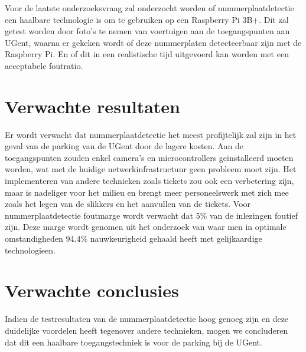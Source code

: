 Voor de laatste onderzoeksvraag zal onderzocht worden of nummerplaatdetectie een haalbare technologie is om te gebruiken op een Raspberry Pi 3B+. Dit zal getest worden door foto’s te nemen van voertuigen aan de toegangspunten aan UGent, waarna er gekeken wordt of deze nummerplaten detecteerbaar zijn met de Raspberry Pi. En of dit in een realistische tijd uitgevoerd kan worden met een acceptabele foutratio.

\section{Verwachte resultaten}
\label{sec:verwachte_resultaten}
Er wordt verwacht dat nummerplaatdetectie het meest profijtelijk zal zijn in het geval van de parking van de UGent door de lagere kosten. Aan de toegangspunten zouden enkel camera’s en microcontrollers geïnstalleerd moeten worden, wat met de huidige netwerkinfrastructuur geen probleem moet zijn. Het implementeren van andere technieken zoals tickets zou ook een verbetering zijn, maar is nadeliger voor het milieu en brengt meer personeelswerk met zich mee zoals het legen van de slikkers en het aanvullen van de tickets. Voor nummerplaatdetectie foutmarge wordt verwacht dat 5\% van de inlezingen foutief zijn. Deze marge wordt genomen uit het onderzoek van \textcite{figuerola2016automated} waar men in optimale omstandigheden 94.4\% nauwkeurigheid gehaald heeft met gelijkaardige technologieen.

\section{Verwachte conclusies}
\label{sec:verwachte_conclusies}

Indien de testresultaten van de nummerplaatdetectie hoog genoeg zijn en deze duidelijke voordelen heeft tegenover andere technieken, mogen we concluderen dat dit een haalbare toegangstechniek is voor de parking bij de UGent.